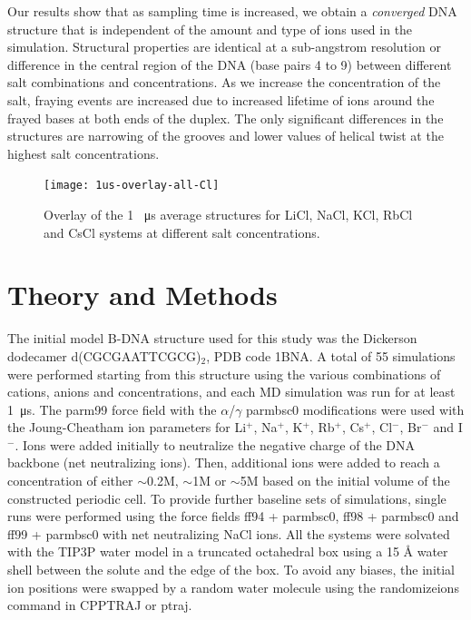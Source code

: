 \documentclass[9pt,lessons]{livecoms}
\begin{document}
Our results show that as
sampling time is increased, we obtain a \textit{converged} DNA
structure that is independent of the amount and type of ions used in
the simulation. Structural properties are identical at a sub-angstrom
resolution or difference in the central region of the DNA (base pairs
4 to 9) between different salt combinations and concentrations. As we
increase the concentration of the salt, fraying events are increased
due to increased lifetime of ions around the frayed bases at both ends
of the duplex. The only significant differences in the structures are
narrowing of the grooves and lower values of helical twist at the
highest salt concentrations.

\begin{figure}[h]
\centering
\texttt{[image: 1us-overlay-all-Cl]}
\caption{Overlay of the 1 \SI{}{\micro\second} average structures for LiCl, NaCl, KCl, RbCl and CsCl systems at different salt concentrations.}
\label{1us-overlay-all-Cl}
\end{figure}



\section{Theory and Methods}

The initial model B-DNA structure used for this study was the
Dickerson dodecamer d(CGCGAATTCGCG)$_{2}$, PDB code
1BNA\cite{Drew1981}. A total of 55 simulations were performed starting
from this structure using the various combinations of cations, anions
and concentrations, and each MD simulation was run for at least
\SI{1}{\micro\second}. The parm99\cite{Cheatham3rd1999} force field
with the $\alpha$/$\gamma$ parmbsc0 modifications\cite{Perez2007} were
used with the Joung-Cheatham\cite{Joung2008,Joung2008a} ion parameters
for Li$^{+}$, Na$^{+}$, K$^{+}$, Rb$^{+}$, Cs$^{+}$, Cl$^{-}$,
Br$^{-}$ and I$^{-}$. Ions were added initially to neutralize the
negative charge of the DNA backbone (net neutralizing ions). Then,
additional ions were added to reach a concentration of either
$\sim$0.2M, $\sim$1M or $\sim$5M based on the initial volume of the
constructed periodic cell. To provide further baseline sets of
simulations, single runs were performed using the force fields
ff94\cite{Cornell1995} + parmbsc0, ff98\cite{Cheatham3rd1997} +
parmbsc0 and ff99\cite{Cheatham3rd1999} + parmbsc0 with net
neutralizing NaCl ions. All the systems were solvated with the
TIP3P\cite{Jorgensen1983} water model in a truncated octahedral box
using a 15 Å water shell between the solute and the edge of the
box. To avoid any biases, the initial ion positions were swapped by a
random water molecule using the randomizeions command in CPPTRAJ or
ptraj\cite{Roe2013,Roe2018}.
\end{document}
